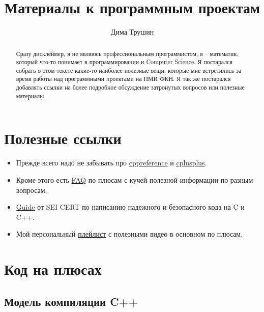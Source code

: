 \documentclass{article}
\author{Дима Трушин}
\title{Материалы к программным проектам}
\date{}
\begin{document}
\maketitle

\tableofcontents

\begin{abstract}
Сразу дисклеймер, я не являюсь профессиональным программистом, я -- математик, который что-то понимает в программировании и Computer Science. Я постарался собрать в этом тексте какие-то наиболее полезные вещи, которые мне встретились за время работы над программными проектами на ПМИ ФКН. Я так же постарался добавлять ссылки на более подробное обсуждение затронутых вопросов или полезные материалы.
\end{abstract}


\section{Полезные ссылки}

\begin{itemize}
\item Прежде всего надо не забывать про \href{https://en.cppreference.com/w/}{cppreference} и \href{https://www.cplusplus.com/}{cplusplus}.

\item Кроме этого есть \href{https://isocpp.org/faq}{FAQ} по плюсам с кучей полезной информации по разным вопросам.

\item \href{https://wiki.sei.cmu.edu/confluence/pages/viewpage.action?pageId=88046682}{Guide} от SEI CERT по написанию надежного и безопасного кода на C и C++. 

\item Мой персональный \href{https://www.youtube.com/playlist?list=PL9ZoDZ0U4QLDyBOaf4biYoFd-TIly-Nhe}{плейлист} с полезными видео в основном по плюсам.
\end{itemize}

\section{Код на плюсах}

\subsection{Модель компиляции C++}
\end{document}
